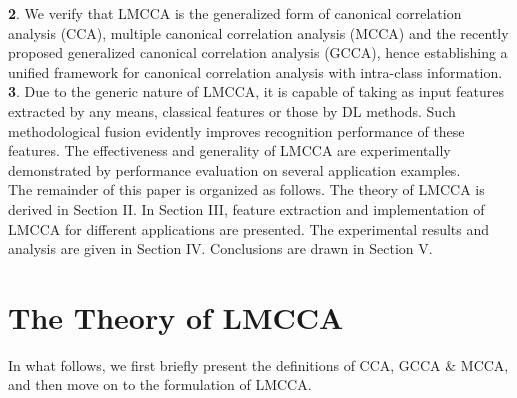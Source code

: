 \documentclass[journal]{IEEEtran}
\begin{document}
\textbf{2}. We verify that LMCCA is the generalized form of canonical correlation analysis (CCA), multiple canonical correlation analysis (MCCA) and the recently proposed generalized canonical correlation analysis (GCCA), hence establishing a unified framework for canonical correlation analysis with intra-class information.\\
\textbf{3}. Due to the generic nature of LMCCA, it is capable of taking as input features extracted by any means, classical features or those by DL methods. Such methodological fusion evidently improves recognition performance of these features. The effectiveness and generality of LMCCA are experimentally demonstrated by performance evaluation on several application examples.\\\indent The remainder of this paper is organized as follows. The theory of LMCCA is derived in Section II. In Section III, feature extraction and implementation of LMCCA for different applications are presented. The experimental results and analysis are given in Section IV. Conclusions are drawn in Section V.
\section{The Theory of LMCCA}
In what follows, we first briefly present the definitions of CCA, GCCA $\&$ MCCA, and then move on to the formulation of LMCCA.
\end{document}
